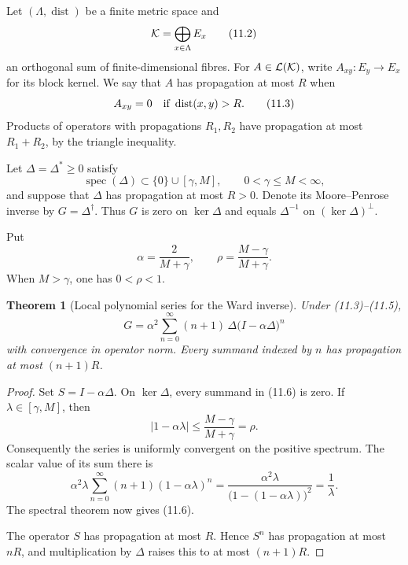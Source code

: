 \documentclass[11pt]{article}
\newtheorem{theorem}{Theorem}[section]
\theoremstyle{remark}
\begin{document}
Let \((\Lambda,\operatorname{dist})\) be a finite metric space and
\[
                     {\cal K}=\bigoplus_{x\in\Lambda}E_x     \tag{11.2}
\]
an orthogonal sum of finite-dimensional fibres.  For
\(A\in{\cal L}({\cal K})\), write \(A_{xy}:E_y\to E_x\) for its block
kernel.  We say that \(A\) has propagation at most \(R\) when
\[
                    A_{xy}=0\quad\hbox{if }\operatorname{dist}(x,y)>R.
                                                               \tag{11.3}
\]
Products of operators with propagations \(R_1,R_2\) have propagation
at most \(R_1+R_2\), by the triangle inequality.

Let \(\Delta=\Delta^*\ge0\) satisfy
\[
 \operatorname{spec}(\Delta)\subset\{0\}\cup[\gamma,M],
 \qquad 0<\gamma\le M<\infty,                               \tag{11.4}
\]
and suppose that \(\Delta\) has propagation at most \(R>0\).  Denote
its Moore--Penrose inverse by \(G=\Delta^\dagger\).  Thus \(G\) is
zero on \(\ker\Delta\) and equals \(\Delta^{-1}\) on
\((\ker\Delta)^\perp\).

Put
\[
 \alpha=\frac{2}{M+\gamma},
 \qquad
 \rho=\frac{M-\gamma}{M+\gamma}.                            \tag{11.5}
\]
When \(M>\gamma\), one has \(0<\rho<1\).

\begin{theorem}[Local polynomial series for the Ward inverse]
\label{thm:v12v11-series}
Under (11.3)--(11.5),
\[
 \boxed{
 G=\alpha^2\sum_{n=0}^{\infty}(n+1)\,
       \Delta\bigl(I-\alpha\Delta\bigr)^n}
                                                               \tag{11.6}
\]
with convergence in operator norm.  Every summand indexed by \(n\)
has propagation at most \((n+1)R\).
\end{theorem}

\begin{proof}
Set \(S=I-\alpha\Delta\).  On \(\ker\Delta\), every summand in
(11.6) is zero.  If \(\lambda\in[\gamma,M]\), then
\[
 |1-\alpha\lambda|
 \le\frac{M-\gamma}{M+\gamma}=\rho.                         \tag{11.7}
\]
Consequently the series is uniformly convergent on the positive
spectrum.  The scalar value of its sum there is
\[
 \alpha^2\lambda
 \sum_{n=0}^{\infty}(n+1)(1-\alpha\lambda)^n
 =
 \frac{\alpha^2\lambda}
      {\bigl(1-(1-\alpha\lambda)\bigr)^2}
 =\frac1\lambda.                                            \tag{11.8}
\]
The spectral theorem now gives (11.6).

The operator \(S\) has propagation at most \(R\).  Hence \(S^n\)
has propagation at most \(nR\), and multiplication by \(\Delta\)
raises this to at most \((n+1)R\).
\end{proof}
\end{document}
